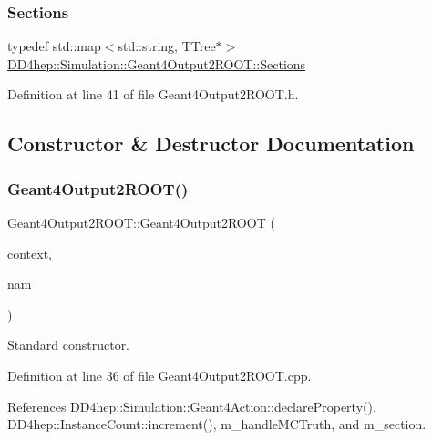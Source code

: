\subsubsection{\texorpdfstring{Sections}{Sections}}
{\footnotesize\ttfamily typedef std\+::map$<$std\+::string, T\+Tree$\ast$$>$ \hyperlink{class_d_d4hep_1_1_simulation_1_1_geant4_output2_r_o_o_t_a6bee4e4ece80aae4e2e07295486f8cd0}{D\+D4hep\+::\+Simulation\+::\+Geant4\+Output2\+R\+O\+O\+T\+::\+Sections}\hspace{0.3cm}{\ttfamily [protected]}}



Definition at line 41 of file Geant4\+Output2\+R\+O\+O\+T.\+h.



\subsection{Constructor \& Destructor Documentation}
\hypertarget{class_d_d4hep_1_1_simulation_1_1_geant4_output2_r_o_o_t_a88f110e8c6e98e19a5580535aeb3120e}{}\label{class_d_d4hep_1_1_simulation_1_1_geant4_output2_r_o_o_t_a88f110e8c6e98e19a5580535aeb3120e} 
\subsubsection{\texorpdfstring{Geant4\+Output2\+R\+O\+O\+T()}{Geant4Output2ROOT()}}
{\footnotesize\ttfamily Geant4\+Output2\+R\+O\+O\+T\+::\+Geant4\+Output2\+R\+O\+OT (\begin{DoxyParamCaption}\item[{\hyperlink{class_d_d4hep_1_1_simulation_1_1_geant4_context}{Geant4\+Context} $\ast$}]{context,  }\item[{const std\+::string \&}]{nam }\end{DoxyParamCaption})}



Standard constructor. 



Definition at line 36 of file Geant4\+Output2\+R\+O\+O\+T.\+cpp.



References D\+D4hep\+::\+Simulation\+::\+Geant4\+Action\+::declare\+Property(), D\+D4hep\+::\+Instance\+Count\+::increment(), m\+\_\+handle\+M\+C\+Truth, and m\+\_\+section.

